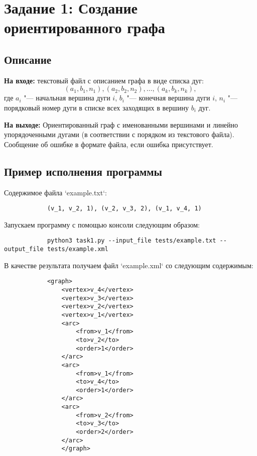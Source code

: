 \documentclass[bachelor, och, report]{shiza}
\begin{document}

\tableofcontents

\section{Задание 1: Создание ориентированного графа}
    \subsection{Описание}

        \textbf{На входе:} текстовый файл с описанием графа в виде списка дуг:
        \[(a_1, b_1, n_1), (a_2, b_2, n_2), \dots, (a_k, b_k, n_k),\] где $a_i$
        "--- начальная вершина дуги $i$, $b_i$ "--- конечная вершина дуги $i$,
        $n_i$ "--- порядковый номер дуги в списке всех заходящих в вершину $b_i$
        дуг.

        \textbf{На выходе:} Ориентированный граф с именованными вершинами и
        линейно упорядоченными дугами (в соответствии с порядком из текстового
        файла). Сообщение об ошибке в формате файла, если ошибка присутствует.

    \subsection{Пример исполнения программы}

        Содержимое файла `example.txt`:

        \begin{verbatim}
            (v_1, v_2, 1), (v_2, v_3, 2), (v_1, v_4, 1)
        \end{verbatim}

        Запускаем программу с помощью консоли следующим образом:

        \begin{verbatim}
            python3 task1.py --input_file tests/example.txt --output_file tests/example.xml
        \end{verbatim}

        В качестве результата получаем файл `example.xml` со следующим содержимым:

        \begin{verbatim}
            <graph>
                <vertex>v_4</vertex>
                <vertex>v_3</vertex>
                <vertex>v_2</vertex>
                <vertex>v_1</vertex>
                <arc>
                    <from>v_1</from>
                    <to>v_2</to>
                    <order>1</order>
                </arc>
                <arc>
                    <from>v_1</from>
                    <to>v_4</to>
                    <order>1</order>
                </arc>
                <arc>
                    <from>v_2</from>
                    <to>v_3</to>
                    <order>2</order>
                </arc>
                </graph>         
        \end{verbatim}
\end{document}
